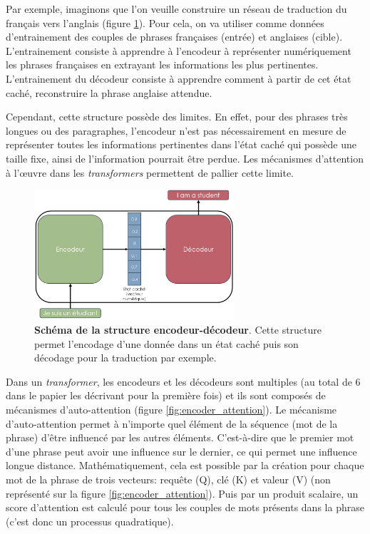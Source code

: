 Par exemple, imaginons que l'on veuille construire un réseau de traduction du français vers l’anglais (figure \ref{fig:encoder_decoder}). Pour cela, on va utiliser comme données d'entrainement des couples de phrases françaises (entrée) et anglaises (cible). L'entrainement consiste à apprendre à l'encodeur à représenter numériquement les phrases françaises en extrayant les informations les plus pertinentes. L'entrainement du décodeur consiste à apprendre comment à partir de cet état caché, reconstruire la phrase anglaise attendue.


Cependant, cette structure possède des limites. En effet, pour des phrases très longues ou des paragraphes, l'encodeur n'est pas nécessairement en mesure de représenter toutes les informations pertinentes dans l'état caché qui possède une taille fixe, ainsi de l'information pourrait être perdue. Les mécanismes d'attention à l'œuvre dans les \textit{transformers} permettent de pallier cette limite.
\begin{figure}[!ht]
 \centering
 \includegraphics[width=0.66\textwidth]{figures/encoder_decoder.png}
 \caption[Schéma de la structure encodeur-décodeur]{\textbf{Schéma de la structure encodeur-décodeur}. Cette structure permet l'encodage d'une donnée dans un état caché puis son décodage pour la traduction par exemple. }
 \label{fig:encoder_decoder}
\end{figure}

Dans un \textit{transformer}, les encodeurs et les décodeurs sont multiples (au total de 6 dans le papier les décrivant pour la première fois) et ils sont composés de mécanismes d'auto-attention (figure \ref{fig:encoder_attention}). Le mécanisme d'auto-attention permet à n'importe quel élément de la séquence (mot de la phrase) d'être influencé par les autres éléments. C'est-à-dire que le premier mot d'une phrase peut avoir une influence sur le dernier, ce qui permet une influence longue distance. Mathématiquement, cela est possible par la création pour chaque mot de la phrase de trois vecteurs: requête (Q), clé (K) et valeur (V) (non représenté sur la figure \ref{fig:encoder_attention}). Puis par un produit scalaire, un score d'attention est calculé pour tous les couples de mots présents dans la phrase (c'est donc un processus quadratique).


